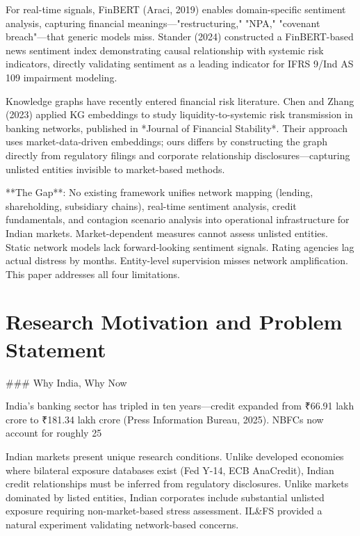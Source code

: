 \documentclass[12pt]{article}
\begin{document}
For real-time signals, FinBERT (Araci, 2019) enables domain-specific sentiment analysis, capturing financial meanings—"restructuring," "NPA," "covenant breach"—that generic models miss. Stander (2024) constructed a FinBERT-based news sentiment index demonstrating causal relationship with systemic risk indicators, directly validating sentiment as a leading indicator for IFRS 9/Ind AS 109 impairment modeling.

Knowledge graphs have recently entered financial risk literature. Chen and Zhang (2023) applied KG embeddings to study liquidity-to-systemic risk transmission in banking networks, published in *Journal of Financial Stability*. Their approach uses market-data-driven embeddings; ours differs by constructing the graph directly from regulatory filings and corporate relationship disclosures—capturing unlisted entities invisible to market-based methods.

**The Gap**: No existing framework unifies network mapping (lending, shareholding, subsidiary chains), real-time sentiment analysis, credit fundamentals, and contagion scenario analysis into operational infrastructure for Indian markets. Market-dependent measures cannot assess unlisted entities. Static network models lack forward-looking sentiment signals. Rating agencies lag actual distress by months. Entity-level supervision misses network amplification. This paper addresses all four limitations.

\section*{Research Motivation and Problem Statement}

### Why India, Why Now

India's banking sector has tripled in ten years—credit expanded from ₹66.91 lakh crore to ₹181.34 lakh crore (Press Information Bureau, 2025). NBFCs now account for roughly 25%

Indian markets present unique research conditions. Unlike developed economies where bilateral exposure databases exist (Fed Y-14, ECB AnaCredit), Indian credit relationships must be inferred from regulatory disclosures. Unlike markets dominated by listed entities, Indian corporates include substantial unlisted exposure requiring non-market-based stress assessment. IL&FS provided a natural experiment validating network-based concerns.
\end{document}
